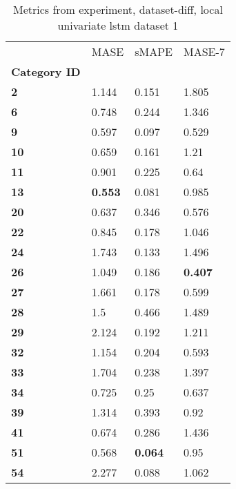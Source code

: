 \begin{table}[H]
\centering
\caption{Metrics from experiment, dataset-diff, local univariate lstm dataset 1}
\label{table:local-univariate-lstm-dataset-1-dataset-diff}
\begin{tabular}{llll}
\toprule
{} &            MASE &           sMAPE &          MASE-7 \\
\textbf{Category ID} &                 &                 &                 \\
\midrule
\textbf{2          } &           1.144 &           0.151 &           1.805 \\
\textbf{6          } &           0.748 &           0.244 &           1.346 \\
\textbf{9          } &           0.597 &           0.097 &           0.529 \\
\textbf{10         } &           0.659 &           0.161 &            1.21 \\
\textbf{11         } &           0.901 &           0.225 &            0.64 \\
\textbf{13         } &  \textbf{0.553} &           0.081 &           0.985 \\
\textbf{20         } &           0.637 &           0.346 &           0.576 \\
\textbf{22         } &           0.845 &           0.178 &           1.046 \\
\textbf{24         } &           1.743 &           0.133 &           1.496 \\
\textbf{26         } &           1.049 &           0.186 &  \textbf{0.407} \\
\textbf{27         } &           1.661 &           0.178 &           0.599 \\
\textbf{28         } &             1.5 &           0.466 &           1.489 \\
\textbf{29         } &           2.124 &           0.192 &           1.211 \\
\textbf{32         } &           1.154 &           0.204 &           0.593 \\
\textbf{33         } &           1.704 &           0.238 &           1.397 \\
\textbf{34         } &           0.725 &            0.25 &           0.637 \\
\textbf{39         } &           1.314 &           0.393 &            0.92 \\
\textbf{41         } &           0.674 &           0.286 &           1.436 \\
\textbf{51         } &           0.568 &  \textbf{0.064} &            0.95 \\
\textbf{54         } &           2.277 &           0.088 &           1.062 \\
\bottomrule
\end{tabular}
\end{table}
